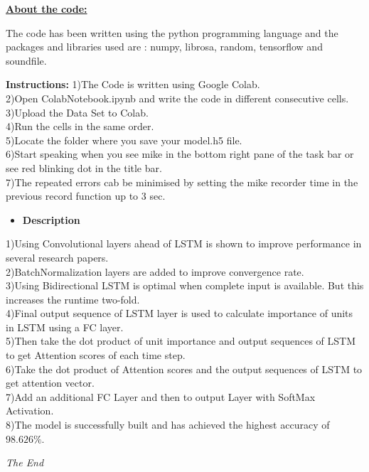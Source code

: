 \documentclass[a4paper,12pt]{article}
\begin{document}
	\textbf{\underline{About the code:}}
	
	The code has been written using the python programming language and the packages and libraries used are : numpy, librosa, random, tensorflow and soundfile. 
	
	
	\newpage

\textbf{Instructions:}	
1)The Code is written using Google Colab.\\

2)Open ColabNotebook.ipynb and write the code in different consecutive cells.\\

3)Upload the Data Set to Colab.\\

4)Run the cells in the same order.\\

5)Locate the folder where you save your model.h5 file.\\

6)Start speaking when you see mike in the bottom right pane of the task bar or see red blinking dot in the title bar.\\

7)The repeated errors cab be minimised by setting the mike recorder time in the previous record function up to 3 sec.\\
	
	
	
	
	
	
	
	
	 \begin{itemize}
	    \item \Large\textbf{Description}
	    	\end{itemize}
	
	
	
1)Using Convolutional layers ahead of LSTM is shown to improve performance in several research papers.\\
2)BatchNormalization layers are added to improve convergence rate.\\
3)Using Bidirectional LSTM is optimal when complete input is available. But this increases the runtime two-fold.\\
4)Final output sequence of LSTM layer is used to calculate importance of units in LSTM using a FC layer.\\
5)Then take the dot product of unit importance and output sequences of LSTM to get Attention scores of each time step.\\
6)Take the dot product of Attention scores and the output sequences of LSTM to get attention vector.\\
7)Add an additional FC Layer and then to output Layer with SoftMax Activation.\\
8)The model is successfully built and has achieved the highest accuracy of $98.626\%$.
	
	
	
	
	
	
	
	
	
	
	
	
	
	
	
	
	\vfill\emph{The End}
	
\end{document}
